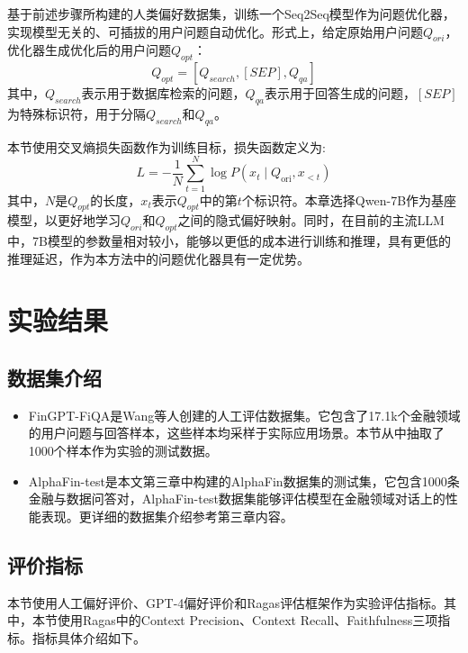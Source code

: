 基于前述步骤所构建的人类偏好数据集，训练一个Seq2Seq\cite{DBLP:journals/corr/abs-2309-16609}模型作为问题优化器，实现模型无关的、可插拔的用户问题自动优化。形式上，给定原始用户问题$Q_{ori}$，优化器生成优化后的用户问题$Q_{opt}$：
\begin{equation}
	Q_{opt} = [Q_{search}, [SEP], Q_{qa}]
\end{equation}
其中，$Q_{search}$表示用于数据库检索的问题，$Q_{qa}$表示用于回答生成的问题，$[SEP]$为特殊标识符，用于分隔$Q_{search}$和$Q_{qa}$。

本节使用交叉熵损失函数作为训练目标，损失函数定义为:
\begin{equation}
	L=-\frac{1}{N} \sum_{t=1}^N \log P\left(x_t \mid Q_{\text{ori}}, x_{<t}\right)
\end{equation}
其中，$N$是$Q_{opt}$的长度，$x_t$表示$Q_{opt}$中的第$t$个标识符。本章选择Qwen-7B作为基座模型，以更好地学习$Q_{ori}$和$Q_{opt}$之间的隐式偏好映射。同时，在目前的主流LLM中，7B模型的参数量相对较小，能够以更低的成本进行训练和推理，具有更低的推理延迟，作为本方法中的问题优化器具有一定优势。

\section{实验结果}

\subsection{数据集介绍}

\begin{itemize}[topsep = 0 pt, itemsep= 0 pt, parsep=0pt, partopsep=0pt, leftmargin=36pt, itemindent=0pt, labelsep=6pt, listparindent=24pt]
	\item FinGPT-FiQA\cite{wang2023fingptbenchmark}是Wang等人创建的人工评估数据集。它包含了17.1k个金融领域的用户问题与回答样本，这些样本均采样于实际应用场景。本节从中抽取了1000个样本作为实验的测试数据。
	\item AlphaFin-test是本文第三章中构建的AlphaFin数据集的测试集，它包含1000条金融与数据问答对，AlphaFin-test数据集能够评估模型在金融领域对话上的性能表现。更详细的数据集介绍参考第三章内容。
\end{itemize}

\subsection{评价指标}

本节使用人工偏好评价、GPT-4偏好评价和Ragas\cite{DBLP:conf/eacl/ESJAS24}评估框架作为实验评估指标。其中，本节使用Ragas中的Context Precision、Context Recall、Faithfulness三项指标。指标具体介绍如下。

